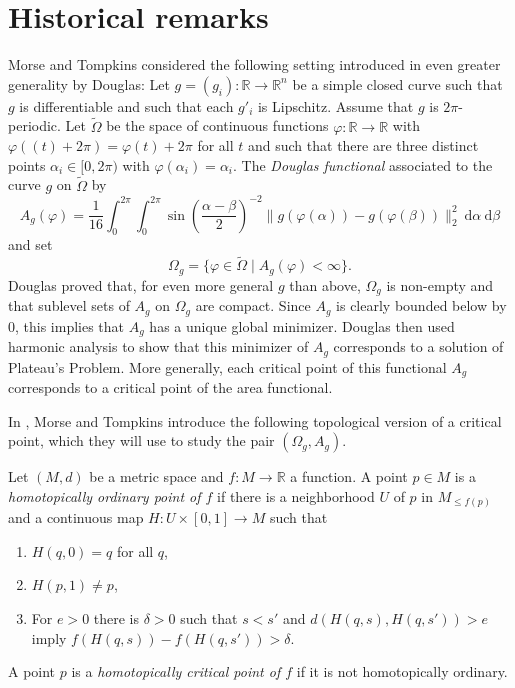 
\section{Historical remarks} \label{s:historical}

Morse and Tompkins considered the following setting introduced in even greater generality by Douglas:
Let $g=(g_i)\colon\mathbb{R}\to\mathbb{R}^n$ be a simple closed curve such that $g$ is differentiable and such that each $g'_i$ is Lipschitz.
Assume that $g$ is $2\pi$-periodic. Let $\tilde{\Omega}$ be the space of continuous functions $\varphi \colon \mathbb{R} \to \mathbb{R}$ with $\varphi((t)+2\pi) = \varphi(t) + 2\pi$ for all $t$ and such that there are three distinct points $\alpha_i \in [0,2\pi)$ with $\varphi(\alpha_i)=\alpha_i$.
The \emph{Douglas functional} associated to the curve $g$ on $\tilde{\Omega}$ by \begin{equation*}
A_g(\varphi)=\frac{1}{16}\int_0^{2\pi}\int_0^{2\pi}\sin\left(\frac{\alpha-\beta}{2}\right)^{-2} \! \lVert g(\varphi(\alpha))-g(\varphi(\beta)) \rVert_2^2 \ \mathrm{d}\alpha \ \mathrm{d}\beta
\end{equation*}
and set
\begin{equation*}
\Omega_g=\{\varphi\in\tilde\Omega\mid A_g(\varphi)<\infty\}.
\end{equation*}
Douglas proved that, for even more general $g$ than above, $\Omega_g$ is non-empty and that sublevel sets of $A_g$ on $\Omega_g$ are compact. Since $A_g$ is clearly bounded below by $0$, this implies that $A_g$ has a unique global minimizer. Douglas then used harmonic analysis to show that this minimizer of $A_g$ corresponds to a solution of Plateau's Problem.
More generally, each critical point of this functional $A_g$ corresponds to a critical point of the area functional.

In \cite{Morse.1939}, Morse and Tompkins introduce the following topological version of a critical point, which they will use to study the pair $(\Omega_g, A_g)$.

Let $(M,d)$ be a metric space and $f\colon M\to\mathbb{R}$ a function.
A point $p \in M$ is a \emph{homotopically ordinary point of $f$} if there is a neighborhood $U$ of $p$ in $M_{\leq f(p)}$ and a continuous map $H \colon U \times [0,1] \to M$ such that
\begin{enumerate}
	\item $H(q,0) = q$ for all $q$,
	\item $H(p,1) \neq p$,
	\item For $e>0$ there is $\delta>0$ such that $s<s'$ and $d(H(q,s), H(q,s')) > e$ imply $f(H(q,s)) - f(H(q,s')) > \delta$.
\end{enumerate}
A point $p$ is a \emph{homotopically critical point of $f$} if it is not homotopically ordinary.

